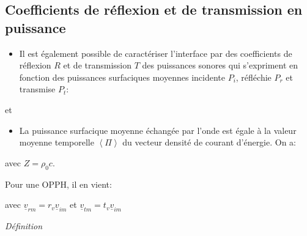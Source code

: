 \documentclass[a4paper, 12pt]{article}
\begin{document}
\subsection{Coefficients de réflexion et de transmission en puissance}

\begin{itemize}
\item Il est également possible de caractériser l'interface par des coefficients de réflexion $R$ et de transmission $T$ des puissances sonores qui s'expriment en fonction des puissances surfaciques moyennes incidente $P_{i}$, réfléchie $P_{r}$ et transmise $P_{t}$:
\end{itemize}

\begin{center}
 et 
\end{center}

\begin{itemize}
\item La puissance surfacique moyenne échangée par l'onde est égale à la valeur moyenne temporelle $\left\langle \Pi\right\rangle$ du vecteur densité de courant d'énergie. On a:
\end{itemize}

\begin{center}
 avec $Z = \rho_{0}c$.
\end{center}

Pour une OPPH, il en vient:
\begin{center}
\end{center}
avec $\underline{v}_{rm}=r_{v}\underline{v}_{im}$ et $\underline{v}_{tm}=t_{v}\underline{v}_{im}$

\textit{Définition}

\noindent{}
\end{document}
